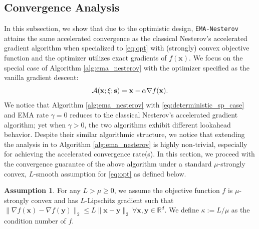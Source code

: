 \documentclass{article}
\theoremstyle{plain}
\theoremstyle{definition}
\newtheorem{assumption}{Assumption}
\theoremstyle{remark}
\def\algname{{\tt EMA-Nesterov}}
\def\bx{\mathbf{x}}
\def\by{\mathbf{y}}
\begin{document}
\subsection{Convergence Analysis} \label{sec:convergence}
\vspace{-0.5\baselineskip}
In this subsection, we show that due to the optimistic design, {\algname} attains the same accelerated convergence as the classical Nesterov's accelerated gradient algorithm when specialized to \eqref{eq:opt} with (strongly) convex objective function and the optimizer utilizes exact gradients of $f(\bx)$.
We focus on the special case of Algorithm \ref{alg:ema_nesterov} with the optimizer specified as the vanilla gradient descent: 
\begin{equation} \label{eq:deterministic_sp_case}
    {\cal A}( \bx; \xi; {\bf s} ) = \bx - \alpha \nabla f( \bx ) .
\end{equation}
We notice that Algorithm \ref{alg:ema_nesterov} with \eqref{eq:deterministic_sp_case} and EMA rate $\gamma = 0$ reduces to the classical Nesterov's accelerated gradient algorithm; yet when $\gamma > 0$, the two algorithms exhibit different lookahead behavior. Despite their similar algorithmic structure, we notice that extending the analysis in \citep{nesterov1983method} to Algorithm \ref{alg:ema_nesterov} is highly non-trivial, especially for achieving the accelerated convergence rate(s). 
In this section, we proceed with the convergence guarantee of the above algorithm under a standard $\mu$-strongly convex, $L$-smooth assumption for \eqref{eq:opt} as defined below.
\begin{assumption} \label{assm:strong_cvx}
    For any $L > \mu \ge 0$, we assume the objective function $f$ is $\mu$-strongly convex and has $L$-Lipschitz gradient such that $\| \nabla f(\bx) - \nabla f(\by) \|_2 \leq L \| \bx - \by \|_2~\forall \bx, \by \in \mathbb{R}^d$. We define $\kappa := L / \mu$ as the condition number of $f$.
\end{assumption}
\end{document}
